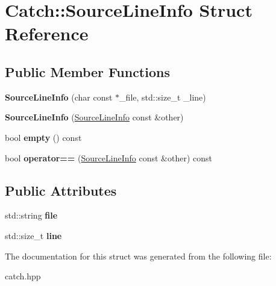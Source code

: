 \hypertarget{structCatch_1_1SourceLineInfo}{
\section{Catch::SourceLineInfo Struct Reference}
\label{structCatch_1_1SourceLineInfo}
}
\subsection*{Public Member Functions}
\begin{DoxyCompactItemize}
\item 
\hypertarget{structCatch_1_1SourceLineInfo_a6218cb890337d37f708ea94063958940}{
{\bfseries SourceLineInfo} (char const $\ast$\_\-file, std::size\_\-t \_\-line)}
\label{structCatch_1_1SourceLineInfo_a6218cb890337d37f708ea94063958940}

\item 
\hypertarget{structCatch_1_1SourceLineInfo_a1ec99cc0547ce5909133aaa8f14ed4b1}{
{\bfseries SourceLineInfo} (\hyperlink{structCatch_1_1SourceLineInfo}{SourceLineInfo} const \&other)}
\label{structCatch_1_1SourceLineInfo_a1ec99cc0547ce5909133aaa8f14ed4b1}

\item 
\hypertarget{structCatch_1_1SourceLineInfo_a9a25ffc0640d1a3dd0c9b7e5fcbba7b9}{
bool {\bfseries empty} () const }
\label{structCatch_1_1SourceLineInfo_a9a25ffc0640d1a3dd0c9b7e5fcbba7b9}

\item 
\hypertarget{structCatch_1_1SourceLineInfo_af0854821b1abfda52796ef0f1294b050}{
bool {\bfseries operator==} (\hyperlink{structCatch_1_1SourceLineInfo}{SourceLineInfo} const \&other) const }
\label{structCatch_1_1SourceLineInfo_af0854821b1abfda52796ef0f1294b050}

\end{DoxyCompactItemize}
\subsection*{Public Attributes}
\begin{DoxyCompactItemize}
\item 
\hypertarget{structCatch_1_1SourceLineInfo_adf3ccf0c2bd326eb3466318af82a94dd}{
std::string {\bfseries file}}
\label{structCatch_1_1SourceLineInfo_adf3ccf0c2bd326eb3466318af82a94dd}

\item 
\hypertarget{structCatch_1_1SourceLineInfo_a841e5d696c7b9cde24e45e61dd979c77}{
std::size\_\-t {\bfseries line}}
\label{structCatch_1_1SourceLineInfo_a841e5d696c7b9cde24e45e61dd979c77}

\end{DoxyCompactItemize}


The documentation for this struct was generated from the following file:\begin{DoxyCompactItemize}
\item 
catch.hpp\end{DoxyCompactItemize}
